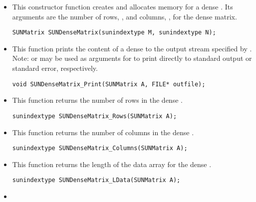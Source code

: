 \begin{itemize}


\item {}

  This constructor function creates and allocates memory for a dense .
  Its arguments are the number of rows, , and columns, , for
  the dense matrix.

  \verb|SUNMatrix SUNDenseMatrix(sunindextype M, sunindextype N);|


\item {}

  This function prints the content of a dense  to the
  output stream specified by .  Note: 
  or  may be used as arguments for  to print
  directly to standard output or standard error, respectively.
 
  \verb|void SUNDenseMatrix_Print(SUNMatrix A, FILE* outfile);|


\item {}

  This function returns the number of rows in the dense .
 
  \verb|sunindextype SUNDenseMatrix_Rows(SUNMatrix A);|


\item {}

  This function returns the number of columns in the dense .
 
  \verb|sunindextype SUNDenseMatrix_Columns(SUNMatrix A);|


\item {}

  This function returns the length of the data array for the dense .
 
  \verb|sunindextype SUNDenseMatrix_LData(SUNMatrix A);|


\item {}


\end{itemize}
